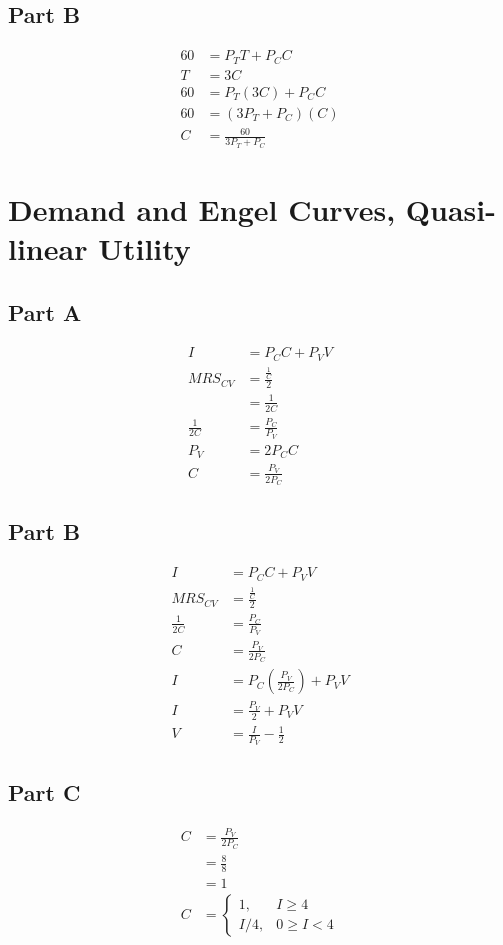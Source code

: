 \documentclass[8pt]{extarticle}
\begin{document}
{\subsection*{Part B}
\begin{align*}
	60 &= P_T T + P_C C \\
	T &= 3C \\
	60 &= P_T (3C) + P_C C \\
	60 &= (3P_T + P_C) (C) \\
	C &= \boxed{\frac{60}{3P_T + P_C}}
\end{align*}
\section*{Demand and Engel Curves, Quasi-linear Utility}
\subsection*{Part A}
\begin{align*}
	I &= P_C C + P_V V \\
	MRS_{CV} &= \frac{\frac{1}{C}}{2} \\
	&= \frac{1}{2C}\\
	\frac{1}{2C} &= \frac{P_C}{P_V} \\
	P_V &= 2P_C C \\
	C &= \boxed{\frac{P_V}{2P_C}}
\end{align*}
\subsection*{Part B}
\begin{align*}
	I &= P_C C + P_V V \\
	MRS_{CV} &= \frac{\frac{1}{C}}{2} \\
	\frac{1}{2C} &= \frac{P_C}{P_V} \\
	C &= \frac{P_V}{2P_C} \\
	I &= P_C \left(\frac{P_V}{2P_C}\right) + P_V V \\
	I &= \frac{P_V}{2} + P_V V \\
	V &= \boxed{\frac{I}{P_V} - \frac{1}{2}}
\end{align*}
\subsection*{Part C}
\begin{align*}
	C &= \frac{P_V}{2P_C} \\
	&= \frac{8}{8} \\
	&= 1\\
	C &= \begin{cases}
		1, & I \geq 4 \\
		I/4,& 0\geq I < 4
	\end{cases}
\end{align*}
}
\end{document}
